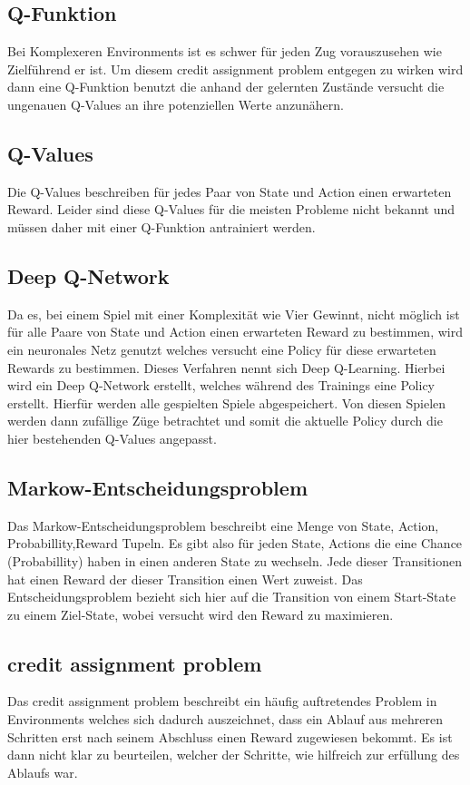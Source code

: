 \subsection{Q-Funktion}
Bei Komplexeren Environments ist es schwer für jeden Zug vorauszusehen wie Zielführend er ist. Um diesem credit assignment problem entgegen zu wirken wird dann eine Q-Funktion benutzt die anhand der gelernten Zustände versucht die ungenauen Q-Values an ihre potenziellen Werte anzunähern.

\subsection{Q-Values}
Die Q-Values beschreiben für jedes Paar von State und Action einen erwarteten Reward. Leider sind diese Q-Values für die meisten Probleme nicht bekannt und müssen daher mit einer Q-Funktion antrainiert werden.

\subsection{Deep Q-Network}
Da es, bei einem Spiel mit einer Komplexität wie Vier Gewinnt, nicht möglich ist für alle Paare von State und Action einen erwarteten Reward zu bestimmen, wird ein neuronales Netz genutzt welches versucht eine Policy für diese erwarteten Rewards zu bestimmen. Dieses Verfahren nennt sich Deep Q-Learning. Hierbei wird ein Deep Q-Network erstellt, welches während des Trainings eine Policy erstellt. Hierfür werden alle gespielten Spiele abgespeichert. Von diesen Spielen werden dann zufällige Züge betrachtet und somit die aktuelle Policy durch die hier bestehenden Q-Values angepasst.

\subsection{Markow-Entscheidungsproblem}
Das Markow-Entscheidungsproblem beschreibt eine Menge von State, Action, Probabillity,Reward Tupeln. Es gibt also für jeden State, Actions die eine Chance (Probabillity) haben in einen anderen State zu wechseln. Jede dieser Transitionen hat einen Reward der dieser Transition einen Wert zuweist. Das Entscheidungsproblem bezieht sich hier auf die Transition von einem Start-State zu einem Ziel-State, wobei versucht wird den Reward zu maximieren.

\subsection{credit assignment problem}
Das credit assignment problem beschreibt ein häufig auftretendes Problem in Environments welches sich dadurch auszeichnet, dass ein Ablauf aus mehreren Schritten erst nach seinem Abschluss einen Reward zugewiesen bekommt. Es ist dann nicht klar zu beurteilen, welcher der Schritte, wie hilfreich zur erfüllung des Ablaufs war.

